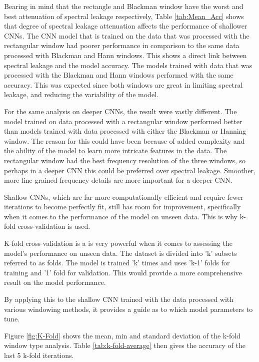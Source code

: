 Bearing in mind that the rectangle and Blackman window have the worst and best attenuation of spectral leakage respectively, Table \ref{tab:Mean_Acc} shows that degree of spectral leakage attenuation affects the performance of shallower CNNs. The CNN model that is trained on the data that was processed with the rectangular window had poorer performance in comparison to the same data processed with Blackman and Hann windows. This shows a direct link between spectral leakage and the model accuracy. The models trained with data that was processed with the Blackman and Hann windows performed with the same accuracy. This was expected since both windows are great in limiting spectral leakage, and reducing the variability of the model. 

For the same analysis on deeper CNNs, the result were vastly different. The model trained on data processed with a rectangular window performed better than models trained with data processed with either the Blackman or Hanning window. The reason for this could have been because of added complexity and the ability of the model to learn more intricate features in the data. The rectangular window had the best frequency resolution of the three windows, so perhaps in a deeper CNN this could be preferred over spectral leakage. Smoother, more fine grained frequency details are more important for a deeper CNN. 

Shallow CNNs, which are far more computationally efficient and require fewer iterations to become perfectly fit, still has room for improvement, specifically when it comes to the performance of the model on unseen data. This is why k-fold cross-validation is used. 

K-fold cross-validation is a is very powerful when it comes to assessing the model's performance on unseen data. The dataset is divided into 'k' subsets referred to as folds. The model is trained 'k' times and uses 'k-1' folds for training and '1' fold for validation. This would provide a more comprehensive result on the model performance. 

By applying this to the shallow CNN trained with the data processed with various windowing methods, it provides a guide as to which model parameters to tune. 

Figure \ref{fig:K-Fold} shows the mean, min and standard deviation of the k-fold window type analysis. Table \ref{tab:k-fold-average} then gives the accuracy of the last 5 k-fold iterations. 

